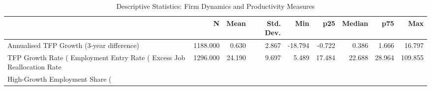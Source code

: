 \begin{table}
\caption{Descriptive Statistics: Firm Dynamics and Productivity Measures}
\label{tab:firm_dynamics_stats}
\begin{tabular}{lrrrrrrrr}
\toprule
 & N & Mean & Std. Dev. & Min & p25 & Median & p75 & Max \\
\midrule
Annualised TFP Growth (3-year difference) & 1188.000 & 0.630 & 2.867 & -18.794 & -0.722 & 0.386 & 1.666 & 16.797 \\
TFP Growth Rate (%
Employment Entry Rate (%
Excess Job Reallocation Rate & 1296.000 & 24.190 & 9.697 & 5.489 & 17.484 & 22.688 & 28.964 & 109.855 \\
High-Growth Employment Share (%
\bottomrule
\end{tabular}
\end{table}
